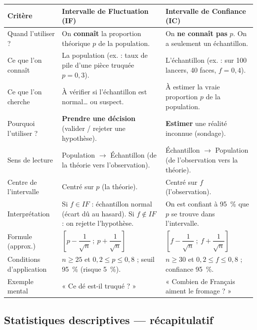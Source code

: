 \documentclass[11pt,a4paper]{article}
\newcommand{\IF}{\textit{IF}}
\begin{document}
	\begin{center}
		\small
		\begin{tabularx}{\textwidth}{>{\raggedright\arraybackslash}p{3.1cm} >{\raggedright\arraybackslash}X >{\raggedright\arraybackslash}X}
			\toprule
			\textbf{Critère} & \textbf{Intervalle de Fluctuation (IF)} &
			\textbf{Intervalle de Confiance (IC)} \\
			\midrule
			Quand l'utiliser ? &
			On \textbf{connaît} la proportion théorique $p$ de la population. &
			On \textbf{ne connaît pas} $p$. On a seulement un échantillon. \\
			Ce que l'on connaît &
			La population (ex. : taux de pile d'une pièce truquée $p = 0{,}3$). &
			L'échantillon (ex. : sur 100 lancers, 40 faces, $f = 0{,}4$). \\
			Ce que l'on cherche &
			À vérifier si l'échantillon est normal… ou suspect. &
			À estimer la vraie proportion $p$ de la population. \\
			Pourquoi l'utiliser ? &
			\textbf{Prendre une décision} (valider / rejeter une hypothèse). &
			\textbf{Estimer} une réalité inconnue (sondage). \\
			Sens de lecture &
			Population $\rightarrow$ Échantillon (de la théorie vers l'observation). &
			Échantillon $\rightarrow$ Population (de l'observation vers la théorie). \\
			Centre de l'intervalle &
			Centré sur $p$ (la théorie). &
			Centré sur $f$ (l'observation). \\
			Interprétation &
			Si $f \in \IF{}$ : échantillon normal (écart dû au hasard).
			Si $f \notin \IF{}$ : on rejette l'hypothèse. &
			On est confiant à 95~\% que $p$ se trouve dans l'intervalle. \\
			Formule (approx.) &
			$\left[p - \dfrac{1}{\sqrt{n}}\ ;\ p + \dfrac{1}{\sqrt{n}}\right]$ &
			$\left[f - \dfrac{1}{\sqrt{n}}\ ;\ f + \dfrac{1}{\sqrt{n}}\right]$ \\
			Conditions d'application &
			$n \geq 25$ et $0{,}2 \leq p \leq 0{,}8$ ; seuil 95~\% (risque 5~\%). &
			$n \geq 30$ et $0{,}2 \leq f \leq 0{,}8$ ; confiance 95~\%. \\
			Exemple mental &
			« Ce dé est-il truqué ? » &
			« Combien de Français aiment le fromage ? » \\
			\bottomrule
		\end{tabularx}
	\end{center}
	
	\subsection{Statistiques descriptives — récapitulatif}
	
\end{document}
